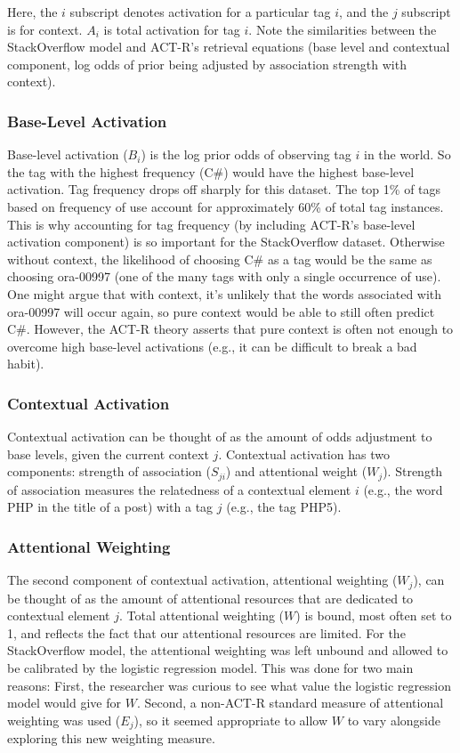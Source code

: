 \documentclass[10pt,letterpaper]{article}
\begin{document}
Here, the $i$ subscript denotes activation for a particular tag $i$, and the $j$ subscript is for context.
$A_{i}$ is total activation for tag $i$.
Note the similarities between the StackOverflow model and ACT-R's retrieval equations (base level and contextual component, log odds of prior being adjusted by association strength with context).

\subsubsection{Base-Level Activation}

Base-level activation ($B_{i}$) is the log prior odds of observing tag $i$ in the world.
So the tag with the highest frequency (C\#) would have the highest base-level activation.
Tag frequency drops off sharply for this dataset.
The top 1\% of tags based on frequency of use account for approximately 60\% of total tag instances.
This is why accounting for tag frequency (by including ACT-R's base-level activation component) is so important for the StackOverflow dataset.
Otherwise without context, the likelihood of choosing C\# as a tag would be the same as choosing ora-00997 (one of the many tags with only a single occurrence of use).
One might argue that with context, it's unlikely that the words associated with ora-00997 will occur again, so pure context would be able to still often predict C\#.
However, the ACT-R theory asserts that pure context is often not enough to overcome high base-level activations (e.g., it can be difficult to break a bad habit).

\subsubsection{Contextual Activation}

Contextual activation can be thought of as the amount of odds adjustment to base levels, given the current context $j$.
Contextual activation has two components: strength of association ($S_{ji}$) and attentional weight ($W_{j}$).
Strength of association measures the relatedness of a contextual element $i$ (e.g., the word PHP in the title of a post) with a tag $j$ (e.g., the tag PHP5).

\subsubsection{Attentional Weighting}

The second component of contextual activation, attentional weighting ($W_{j}$), can be thought of as the amount of attentional resources that are dedicated to contextual element $j$.
Total attentional weighting ($W$) is bound, most often set to 1, and reflects the fact that our attentional resources are limited.
For the StackOverflow model, the attentional weighting was left unbound and allowed to be calibrated by the logistic regression model.
This was done for two main reasons:
First, the researcher was curious to see what value the logistic regression model would give for $W$.
Second, a non-ACT-R standard measure of attentional weighting was used ($E_{j}$), so it seemed appropriate to allow $W$ to vary alongside exploring this new weighting measure. 
\end{document}
